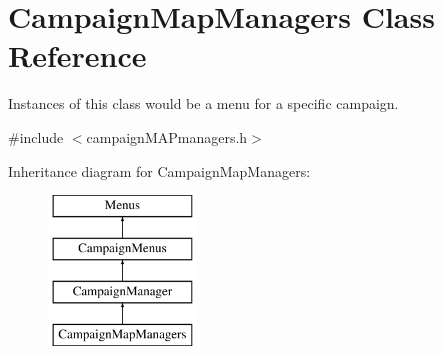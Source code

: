 \hypertarget{class_campaign_map_managers}{}\section{Campaign\+Map\+Managers Class Reference}
\label{class_campaign_map_managers}


Instances of this class would be a menu for a specific campaign.  




{\ttfamily \#include $<$campaign\+M\+A\+Pmanagers.\+h$>$}

Inheritance diagram for Campaign\+Map\+Managers\+:\begin{figure}[H]
\begin{center}
\leavevmode
\includegraphics[height=4.000000cm]{class_campaign_map_managers}
\end{center}
\end{figure}
